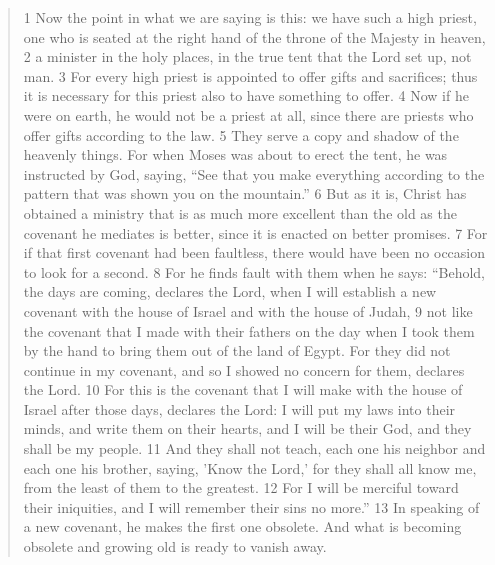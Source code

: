 \begin{quote}
1 Now the point in what we are saying is this: we have such a high priest, one who is seated at the right hand of the throne of the Majesty in heaven, 2 a minister in the holy places, in the true tent that the Lord set up, not man. 3 For every high priest is appointed to offer gifts and sacrifices; thus it is necessary for this priest also to have something to offer. 4 Now if he were on earth, he would not be a priest at all, since there are priests who offer gifts according to the law. 5 They serve a copy and shadow of the heavenly things. For when Moses was about to erect the tent, he was instructed by God, saying, ``See that you make everything according to the pattern that was shown you on the mountain.'' 6 But as it is, Christ has obtained a ministry that is as much more excellent than the old as the covenant he mediates is better, since it is enacted on better promises. 7 For if that first covenant had been faultless, there would have been no occasion to look for a second. 8 For he finds fault with them when he says: ``Behold, the days are coming, declares the Lord, when I will establish a new covenant with the house of Israel and with the house of Judah, 9 not like the covenant that I made with their fathers on the day when I took them by the hand to bring them out of the land of Egypt. For they did not continue in my covenant, and so I showed no concern for them, declares the Lord. 10 For this is the covenant that I will make with the house of Israel after those days, declares the Lord: I will put my laws into their minds, and write them on their hearts, and I will be their God, and they shall be my people. 11 And they shall not teach, each one his neighbor and each one his brother, saying, 'Know the Lord,' for they shall all know me, from the least of them to the greatest. 12 For I will be merciful toward their iniquities, and I will remember their sins no more.'' 13 In speaking of a new covenant, he makes the first one obsolete. And what is becoming obsolete and growing old is ready to vanish away. 
\end{quote}

\discussion

\questions
